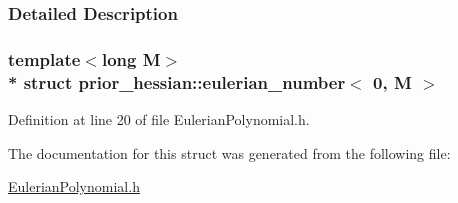 \subsubsection{Detailed Description}
\subsubsection*{template$<$long M$>$\\*
struct prior\+\_\+hessian\+::eulerian\+\_\+number$<$ 0, M $>$}



Definition at line 20 of file Eulerian\+Polynomial.\+h.



The documentation for this struct was generated from the following file\+:\begin{DoxyCompactItemize}
\item 
\hyperlink{EulerianPolynomial_8h}{Eulerian\+Polynomial.\+h}\end{DoxyCompactItemize}
